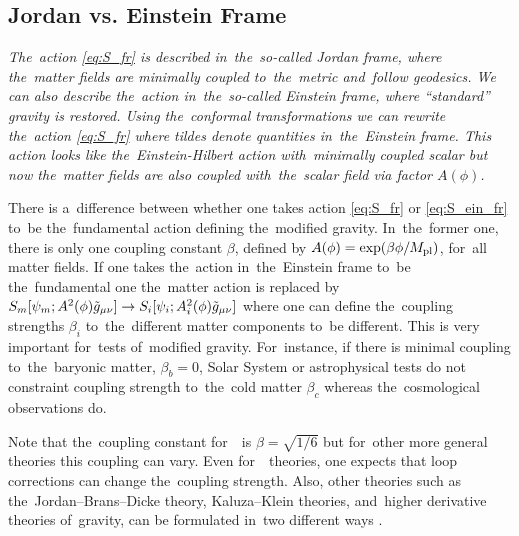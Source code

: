 \subsection{Jordan vs. Einstein Frame}
{\itshape
The~action \eqref{eq:S_fr} is described in~the~so-called Jordan frame, where the~matter fields are minimally coupled to~the~metric and~follow geodesics. We can also describe the~action in~the~so-called Einstein frame, where ``standard'' gravity is restored. Using the~conformal transformations
we can rewrite the~action \eqref{eq:S_fr}
where tildes denote quantities in~the~Einstein frame. This action looks like the~Einstein-Hilbert action with~minimally coupled scalar but now the~matter fields are also coupled with~the~scalar field via factor $A(\phi)$. %

There is a~difference between whether one takes action \eqref{eq:S_fr} or \eqref{eq:S_ein_fr} to~be the~fundamental action defining the~modified gravity. In~the~former one, there is only one coupling constant $\beta$, defined by $A(\phi)=\exp(\beta\phi/M_{\text{\scriptsize pl}})$, for~all matter fields. If one takes the~action in~the~Einstein frame to~be the~fundamental one the~matter action is replaced by $S_m[\psi_m;A^2(\phi)\tilde{g}_{\mu\nu}]\rightarrow S_i[\psi_i;A_i^2(\phi)\tilde{g}_{\mu\nu}]$ where one can define the~coupling strengths $\beta_i$ to~the~different matter components to~be different. This is very important for~tests of~modified gravity. For~instance, if there is minimal coupling to~the~baryonic matter, $\beta_b=0$, Solar System or astrophysical tests do not constraint coupling strength to~the~cold matter $\beta_c$ whereas the~cosmological observations do.
}

Note that the~coupling constant for~\fR\ is $\beta=\sqrt{1/6}$ but for~other more general theories this coupling can vary. Even for~\fR\ theories, one expects that loop corrections can change the~coupling strength. Also, other theories such as the~Jordan--Brans--Dicke theory, Kaluza--Klein theories, and~higher derivative theories of~gravity, can be formulated in~two different ways \parencite{Faraoni:1998qx}.

